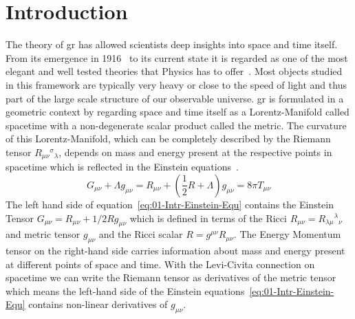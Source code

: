 \section{Introduction}
\label{sec:01-Introduction}
The theory of \ac{gr} has allowed scientists deep insights into space and time itself.
From its emergence in 1916~\cite{einsteinGrundlageAllgemeinenRelativitaetstheorie1916a} to its current state it is regarded as one of the most elegant and well tested theories that Physics has to offer~\cite{hafeleAroundtheWorldAtomicClocks1972, vessotTestRelativisticGravitation1980a, battatApachePointObservatory2009}.
Most objects studied in this framework are typically very heavy or close to the speed of light and thus part of the large scale structure of our observable universe.
\ac{gr} is formulated in a geometric context by regarding space and time itself as a Lorentz-Manifold called spacetime with a non-degenerate scalar product called the metric.
The curvature of this Lorentz-Manifold, which can be completely described by the Riemann tensor $R_{\mu \nu}{ }^{\sigma}{ }_{\lambda}$, depends on mass and energy present at the respective points in spacetime which is reflected in the Einstein equations~\cite{einsteinFeldgleichungenGravitation1915}.
\begin{equation}
	G_{\mu\nu}+\Lambda g_{\mu\nu} = R_{\mu\nu} + \left(\frac{1}{2}R+\Lambda\right)g_{\mu\nu}=8\pi T_{\mu\nu}
	\label{eq:01-Intr-Einstein-Equ}
\end{equation}
The left hand side of equation~\ref{eq:01-Intr-Einstein-Equ} contains the Einstein Tensor $G_{\mu\nu}=R_{\mu\nu}+1/2Rg_{\mu\nu}$ which is defined in terms of the Ricci $R_{\mu \nu}=R_{\lambda\mu}{}^{\lambda}{}_\nu$ and metric tensor $g_{\mu\nu}$ and the Ricci scalar $R=g^{\mu\nu}R_{\mu\nu}$.
The Energy Momentum tensor on the right-hand side carries information about mass and energy present at different points of space and time.
With the Levi-Civita connection on spacetime we can write the Riemann tensor as derivatives of the metric tensor which means the left-hand side of the Einstein equations~\ref{eq:01-Intr-Einstein-Equ} contains non-linear derivatives of $g_{\mu\nu}$.

